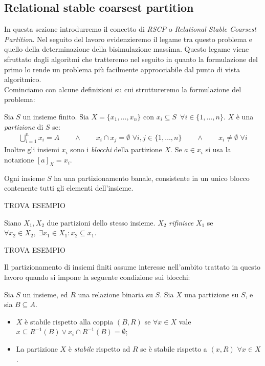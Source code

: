 \subsection{Relational stable coarsest partition}
\label{sec:rscp}
In questa sezione introdurremo il concetto di \emph{RSCP} o \emph{Relational Stable Coarsest Partition}. Nel seguito del lavoro evidenzieremo il legame tra questo problema e quello della determinazione della bisimulazione massima. Questo legame viene sfruttato dagli algoritmi che tratteremo nel seguito in quanto la formulazione del primo lo rende un problema più facilmente approcciabile dal punto di vista algoritmico.\\
Cominciamo con alcune definizioni su cui struttureremo la formulazione del problema:
\begin{definition}
    Sia $S$ un insieme finito. Sia $X = \{x_1, \dots, x_n\}$ con $x_i \subseteq S \,\,\,\forall i \in \{1,\dots,n\}$. $X$ è una \emph{partizione} di $S$ se:
    \begin{gather*}
        \bigcup_{i = 1}^n x_i = A \qquad \land \qquad x_i \cap x_j = \emptyset \,\,\forall i,j \in \{1,\dots,n\} \qquad \land \qquad x_i \neq \emptyset \,\,\forall i
    \end{gather*}
    Inoltre gli insiemi $x_i$ sono i \emph{blocchi} della partizione $X$. Se $a \in x_i$ si usa la notazione $[a]_X = x_i$.
\end{definition}
\begin{observation}
    \label{obs:part_banale}
    Ogni insieme $S$ ha una partizionamento banale, consistente in un unico blocco contenente tutti gli elementi dell'insieme.
\end{observation}
\begin{example}
    TROVA ESEMPIO
    \label{exa:set_partition}
\end{example}
\begin{definition}
    Siano $X_1,X_2$ due partizioni dello stesso insieme. $X_2$ \emph{rifinisce} $X_1$ se $\forall x_2 \in X_2, \,\,\exists x_1 \in X_1 : x_2 \subseteq x_1$.
\end{definition}
\begin{example}
    TROVA ESEMPIO
\end{example}
Il partizionamento di insiemi finiti assume interesse nell'ambito trattato in questo lavoro quando si impone la seguente condizione sui blocchi:
\begin{definition}
    Sia $S$ un insieme, ed $R$ una relazione binaria su $S$. Sia $X$ una partizione su $S$, e sia $B \subseteq A$.
    \begin{itemize}
        \item $X$ è stabile rispetto alla coppia $(B,R)$ se $\forall x \in X$ vale $x \subseteq R^{-1}(B) \lor x_i \cap R^{-1}(B) = \emptyset$;
        \item La partizione $X$ è \emph{stabile} rispetto ad $R$ se è stabile rispetto a $(x,R) \,\,\forall x \in X$.
    \end{itemize}
\end{definition}
